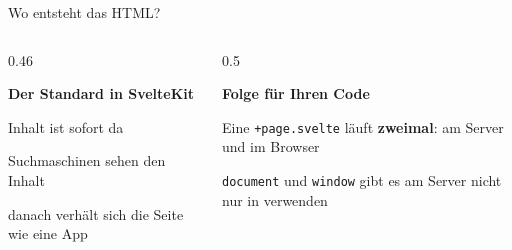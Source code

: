 
\begin{frame}{Wo entsteht das HTML?}
  \centering

  \vspace{0.6em}
  \begin{columns}[onlytextwidth,t]
    \begin{column}{0.46\textwidth}
      \raggedright\footnotesize
      \textbf{Der Standard in SvelteKit}
      \begin{tugitemize}
        \item[\itemPlus] Inhalt ist sofort da
        \item[\itemPlus] Suchmaschinen sehen den Inhalt
        \item[\itemPlus] danach verhält sich die Seite wie eine App
      \end{tugitemize}
    \end{column}
    \begin{column}{0.5\textwidth}
      \raggedright\footnotesize
      \textbf{Folge für Ihren Code}
      \begin{tugitemize}
        \item Eine \texttt{+page.svelte} läuft \textbf{zweimal}: am Server und im Browser
        \item \texttt{document} und \texttt{window} gibt es am Server nicht
              \textarrow{} nur in  verwenden
      \end{tugitemize}
    \end{column}
  \end{columns}
\end{frame}

